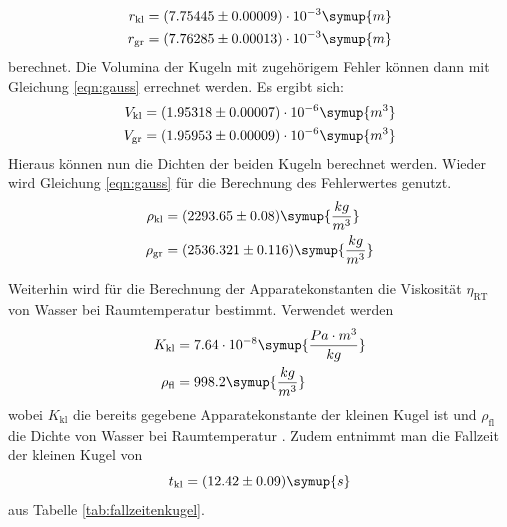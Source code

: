\begin{equation*}
\begin{aligned}
r_{\text{kl}} &= (7.75445 \pm 0.00009) \cdot 10^{-3}\symup{m} \\
r_{\text{gr}} &= (7.76285 \pm 0.00013) \cdot 10^{-3}\symup{m}
\end{aligned}
\end{equation*}
berechnet. Die Volumina der Kugeln mit zugehörigem Fehler können dann mit Gleichung \eqref{eqn:gauss} errechnet werden. Es ergibt sich:
\begin{equation*}
\begin{aligned}
V_{\text{kl}} &= (1.95318 \pm 0.00007) \cdot 10^{-6}\symup{m^3} \\
V_{\text{gr}} &= (1.95953 \pm 0.00009) \cdot 10^{-6}\symup{m^3}
\end{aligned}
\end{equation*}
Hieraus können nun die Dichten der beiden Kugeln berechnet werden. Wieder wird Gleichung \eqref{eqn:gauss} für die Berechnung des Fehlerwertes genutzt.
\begin{equation*}
\begin{aligned}
\rho_{\text{kl}} &= (2293.65 \pm 0.08) \symup{\frac{kg}{m^3}} \\
\rho_{\text{gr}} &= (2536.321 \pm 0.116) \symup{\frac{kg}{m^3}}
\end{aligned}
\end{equation*}
 
Weiterhin wird für die Berechnung der Apparatekonstanten die Viskosität $\eta_{\text{RT}}$ von Wasser bei Raumtemperatur bestimmt. Verwendet werden
\begin{equation*}
\begin{aligned}
K_{\text{kl}} &= 7.64 \cdot 10^{-8}  \symup{\frac{Pa \cdot m^3}{kg}} \\
\rho_{\text{fl}} &= 998.2 \symup{\frac{kg}{m^3}}
\end{aligned}
\end{equation*}
wobei $K_{\text{kl}}$ die bereits gegebene Apparatekonstante der kleinen Kugel ist und $\rho_{\text{fl}}$ die Dichte von Wasser bei Raumtemperatur \cite{waterdensity}.
Zudem entnimmt man die Fallzeit der kleinen Kugel von
\begin{equation*}
t_{\text{kl}} = (12.42 \pm 0.09) \symup{s} \\
\end{equation*}
aus Tabelle \eqref{tab:fallzeitenkugel}.

